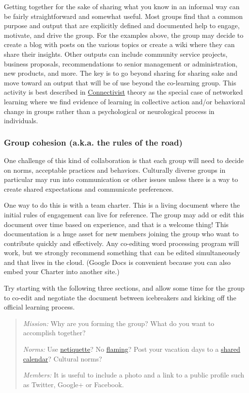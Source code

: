 Getting together for the sake of sharing what you know in an informal
way can be fairly straightforward and somewhat useful. Most groups find
that a common purpose and output that are explicitly defined and
documented help to engage, motivate, and drive the group. For the
examples above, the group may decide to create a blog with posts on the
various topics or create a wiki where they can share their insights.
Other outputs can include community service projects, business
proposals, recommendations to senior management or administration, new
products, and more. The key is to go beyond sharing for sharing sake and
move toward an output that will be of use beyond the co-learning group.
This activity is best described in
\href{http://www.elearnspace.org/Articles/connectivism.htm}{Connectivist}
theory as the special case of networked learning where we find evidence
of learning in collective action and/or behavioral change in groups
rather than a psychological or neurological process in individuals.

\subsubsection{Group cohesion (a.k.a. the rules of the road)}

One challenge of this kind of collaboration is that each group will need
to decide on norms, acceptable practices and behaviors. Culturally
diverse groups in particular may run into communication or other issues
unless there is a way to create shared expectations and communicate
preferences.

One way to do this is with a team charter. This is a living document
where the initial rules of engagement can live for reference. The group
may add or edit this document over time based on experience, and that is
a welcome thing! This documentation is a huge asset for new members
joining the group who want to contribute quickly and effectively. Any
co-editing word processing program will work, but we strongly recommend
something that can be edited simultaneously and that lives in the cloud.
(Google Docs is convenient because you can also embed your Charter into
another site.)

Try starting with the following three sections, and allow some time for
the group to co-edit and negotiate the document between icebreakers and
kicking off the official learning process.

\begin{quote}
\emph{Mission:} Why are you forming the group? What do you want to
accomplish together?

\emph{Norms:} Use
\href{http://en.wikipedia.org/wiki/Netiquette\#Netiquette}{netiquette}?
No
\href{http://en.wikipedia.org/wiki/Flaming_\%28Internet\%29}{flaming}?
Post your vacation days to a
\href{http://support.google.com/calendar/bin/answer.py?hl=en\&answer=36598}{shared
calendar}? Cultural norms?

\emph{Members:} It is useful to include a photo and a link to a public
profile such as Twitter, Google+ or Facebook.
\end{quote}

